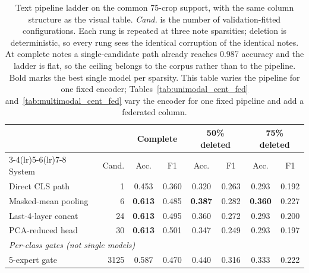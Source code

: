 
\begin{table}[t]
\caption{Text pipeline ladder on the common 75-crop support, with the same column structure as the visual table. \emph{Cand.} is the number of validation-fitted configurations. Each rung is repeated at three note sparsities; deletion is deterministic, so every rung sees the identical corruption of the identical notes. At complete notes a single-candidate path already reaches 0.987 accuracy and the ladder is flat, so the ceiling belongs to the corpus rather than to the pipeline. Bold marks the best single model per sparsity. This table varies the pipeline for one fixed encoder; Tables~\ref{tab:unimodal_cent_fed} and~\ref{tab:multimodal_cent_fed} vary the encoder for one fixed pipeline and add a federated column.}
\label{tab:text_ladder}
\centering\footnotesize
\setlength\tabcolsep{2.6pt}
\begin{tabular}{lrcccccc}
\toprule
& & \multicolumn{2}{c}{Complete} & \multicolumn{2}{c}{50\% deleted} & \multicolumn{2}{c}{75\% deleted}\\
\cmidrule(lr){3-4}\cmidrule(lr){5-6}\cmidrule(lr){7-8}
System & Cand. & Acc. & F1 & Acc. & F1 & Acc. & F1\\
\midrule
Direct CLS path & 1 & 0.453 & 0.360 & 0.320 & 0.263 & 0.293 & 0.192\\
Masked-mean pooling & 6 & \textbf{0.613} & 0.485 & \textbf{0.387} & 0.282 & \textbf{0.360} & 0.227\\
Last-4-layer concat & 24 & \textbf{0.613} & 0.495 & 0.360 & 0.272 & 0.293 & 0.200\\
PCA-reduced head & 30 & \textbf{0.613} & 0.501 & 0.347 & 0.249 & 0.293 & 0.197\\
\midrule
\multicolumn{8}{l}{\emph{Per-class gates (not single models)}}\\
5-expert gate & 3125 & 0.587 & 0.470 & 0.440 & 0.316 & 0.333 & 0.222\\
\bottomrule
\end{tabular}
\end{table}

